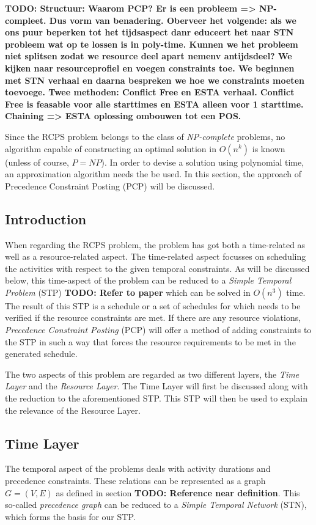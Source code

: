 \documentclass{article}
\newcommand{\TODO}[1]{{\color{red}\textbf{TODO: #1}}}
\begin{document}
\TODO{Structuur: Waarom PCP? Er is een probleem => NP-compleet. Dus vorm van benadering. Oberveer het volgende: als we ons puur beperken tot het tijdsaspect danr educeert het naar STN probleem wat op te lossen is in poly-time. Kunnen we het probleem niet splitsen zodat we resource deel apart nemenv antijdsdeel? We kijken naar resourceprofiel en voegen constraints toe. We beginnen met STN verhaal en daarna bespreken we hoe we constraints moeten toevoege. Twee methoden: Conflict Free en ESTA verhaal. Conflict Free is feasable voor alle starttimes en ESTA alleen voor 1 starttime. Chaining => ESTA oplossing ombouwen tot een POS.}

Since the RCPS problem belongs to the class of \emph{NP-complete} problems, no algorithm capable of constructing an optimal solution in $O(n^k)$ is known (unless of course, $P=NP$). In order to devise a solution using polynomial time, an approximation algorithm needs the be used. In this section, the approach of Precedence Constraint Posting (PCP) will be discussed.

\subsection{Introduction}
When regarding the RCPS problem, the problem has got both a time-related as well as a resource-related aspect. 
The time-related aspect focusses on scheduling the activities with respect to the given temporal constraints. 
As will be discussed below, this time-aspect of the problem can be reduced to a \emph{Simple Temporal Problem} (STP) \TODO{Refer to paper} which can be solved in $O(n^3)$ time. 
The result of this STP is a schedule or a set of schedules for which needs to be verified if the resource constraints are met. 
If there are any resource violations, \emph{Precedence Constraint Posting} (PCP) will offer a method of adding constraints to the STP in such a way that forces the resource requirements to be met in the generated schedule. 

The two aspects of this problem are regarded as two different layers, the \emph{Time Layer} and the \emph{Resource Layer}.
The Time Layer will first be discussed along with the reduction to the aforementioned STP. 
This STP will then be used to explain the relevance of the Resource Layer.

\subsection{Time Layer}
The temporal aspect of the problems deals with activity durations and precedence constraints.
These relations can be represented as a graph $G=(V,E)$ as defined in section \TODO{Reference near definition}. 
This so-called \emph{precedence graph} can be reduced to a \emph{Simple Temporal Network} (STN), which forms the basis for our STP.
\end{document}
